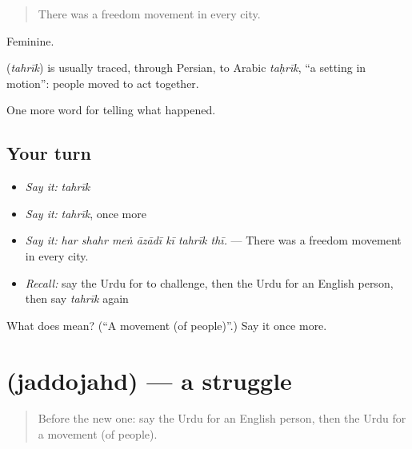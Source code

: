 \begin{quote}
There was a freedom movement in every city.
\end{quote}

Feminine.

\begin{cousinweb}
\textbf{} (\emph{tahrīk}) is usually traced, through Persian, to Arabic \emph{taḥrīk}, \textquotedblleft{}a setting in motion\textquotedblright{}: people moved to act together.
\end{cousinweb}

\begin{grammarlens}[title={What you've built}]
One more word for telling what happened.
\end{grammarlens}

\subsection*{Your turn}
\begin{itemize}
\raggedright
  \item \emph{Say it:} \emph{tahrīk}
  \item \emph{Say it:} \emph{tahrīk}, once more
  \item \emph{Say it:} \emph{har shahr meṅ āzādī kī tahrīk thī.} — There was a freedom movement in every city.
  \item \emph{Recall:} say the Urdu for to challenge, then the Urdu for an English person, then say \emph{tahrīk} again
\end{itemize}

\begin{tcolorbox}[breakable,colback=teal!4,colframe=teal!35!black,title={Before you move on}]
What does  mean? (\textquotedblleft{}A movement (of people)\textquotedblright{}.) Say it once more.
\end{tcolorbox}
\section[\texorpdfstring{\ur{جدوجہد} (jaddojahd)}{جدوجہد (jaddojahd)}]{ (jaddojahd) — a struggle}

\label{lesson:UR-C313-jaddojahd}



\begin{quote}
Before the new one: say the Urdu for an English person, then the Urdu for a movement (of people).
\end{quote}

